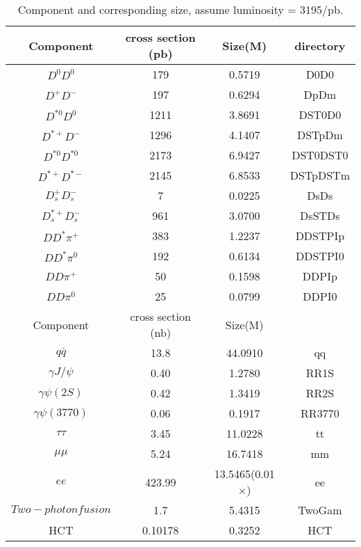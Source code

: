 \begin{table}[htp]
\begin{center}
\caption{Component and corresponding size, assume luminosity = 3195/pb.}
\begin{tabular}{c|c|c|c} \hline
Component        & cross section (pb) & Size(M) & directory \\ \hline
$D^{0}D^{0}$     &        179         & 0.5719  &  D0D0 \\
$D^{+}D^{-}$     &        197         & 0.6294  &  DpDm \\
$D^{*0}D^{0}$    &       1211         & 3.8691  &  DST0D0 \\
$D^{*+}D^{-}$    &       1296         & 4.1407  &  DSTpDm \\
$D^{*0}D^{*0}$   &       2173         & 6.9427  &  DST0DST0 \\
$D^{*+}D^{*-}$   &       2145         & 6.8533  &  DSTpDSTm \\
$D_{s}^{+}D_{s}^{-}$ &      7         & 0.0225  &  DsDs \\
$D_{s}^{*+}D_{s}^{-}$ &   961         & 3.0700  &  DsSTDs \\
\hline
$DD^{*}\pi^{+}$  &        383         & 1.2237  &  DDSTPIp \\
$DD^{*}\pi^{0}$  &        192         & 0.6134  &  DDSTPI0 \\
$DD\pi^{+}$      &         50         & 0.1598  &  DDPIp \\
$DD\pi^{0}$      &         25         & 0.0799  &  DDPI0 \\
\hline
Component        &  cross section (nb)& Size(M)\\ \hline
$q\bar{q}$       &       13.8         & 44.0910  & qq \\
$\gamma J/\psi$  &        0.40        &  1.2780  & RR1S \\
$\gamma \psi(2S)$&        0.42        &  1.3419  & RR2S \\
$\gamma \psi(3770)$ &     0.06        &  0.1917  & RR3770 \\
$\tau \tau$      &        3.45        & 11.0228  & tt \\
$\mu \mu$        &        5.24        & 16.7418  & mm \\
$ee$             &      423.99        & 13.5465(0.01$\times$)  & ee\\
$Two-photon fusion$  &        1.7         &  5.4315   & TwoGam \\
HCT              &        0.10178     &  0.3252   & HCT \\
\hline
\end{tabular}
\label{tab:genMC}
\end{center}
\end{table}

